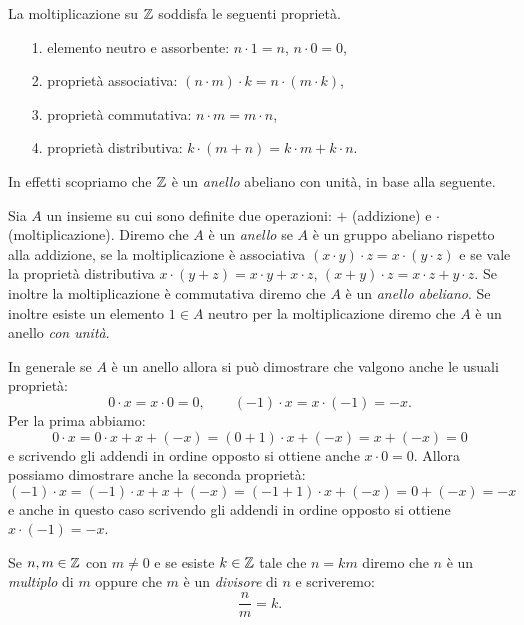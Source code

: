   \begin{theorem}
    La moltiplicazione su ${\mathbb Z}$ soddisfa le seguenti proprietà.
    \begin{enumerate}
      \item[1.] elemento neutro e assorbente: $n\cdot 1 = n$, $n\cdot 0 = 0$,
      \item[2.] proprietà associativa: $(n\cdot m)\cdot k = n \cdot (m\cdot k)$,
      \item[3.] proprietà commutativa: $n\cdot m = m\cdot n$,
      \item[4.] proprietà distributiva: $k\cdot(m+n) = k\cdot m + k\cdot n$. 
    \end{enumerate}
  \end{theorem}

In effetti scopriamo che ${\mathbb Z}$ è un \emph{anello}%
%
 abeliano con unità, in base alla seguente.
%
\begin{definition}[anello]
  \label{def:anello}%
  Sia $A$ un insieme su cui sono definite due operazioni: $+$ (addizione) e $\cdot$ (moltiplicazione).  
  Diremo che $A$ è un \emph{anello} se $A$ è un gruppo abeliano rispetto alla 
  addizione, 
  se la moltiplicazione è associativa $(x\cdot y)\cdot z = x\cdot (y\cdot z)$ 
  e se vale la proprietà distributiva $x\cdot(y+z) = x\cdot y + x\cdot z$,
  $(x+y)\cdot z = x\cdot z + y\cdot z$.
  Se inoltre la moltiplicazione è commutativa diremo che $A$ è un \emph{anello abeliano}.
  Se inoltre esiste un elemento $1\in A$ neutro per la moltiplicazione 
  diremo che $A$ è un anello \emph{con unità}.
\end{definition}

In generale se $A$ è un anello allora si può dimostrare che valgono anche le usuali proprietà:
\[
  0\cdot x = x\cdot 0 = 0, \qquad
  (-1)\cdot x = x \cdot (-1) = -x.
\]
Per la prima abbiamo: 
\[
  0\cdot x = 0\cdot x + x + (-x) = (0+1)\cdot x + (-x) = x + (-x) = 0
\]
e scrivendo gli addendi in ordine opposto si ottiene anche $x\cdot 0 = 0$.
Allora possiamo dimostrare anche la seconda proprietà:
\[
   (-1)\cdot x = (-1)\cdot x + x + (-x) = (-1 + 1)\cdot x + (-x) = 0 + (-x) = -x
\]
e anche in questo caso scrivendo gli addendi in ordine opposto si ottiene $x\cdot(-1)=-x$.

Se $n,m\in{\mathbb Z}$ con $m\neq 0$ e 
%
se esiste $k\in{\mathbb Z}$ tale 
che $n=km$ diremo che $n$ è un \emph{multiplo}
di $m$ oppure che $m$ è un \emph{divisore}%
%
 di $n$
e scriveremo:
\[
  \frac{n}{m} = k.  
\]

